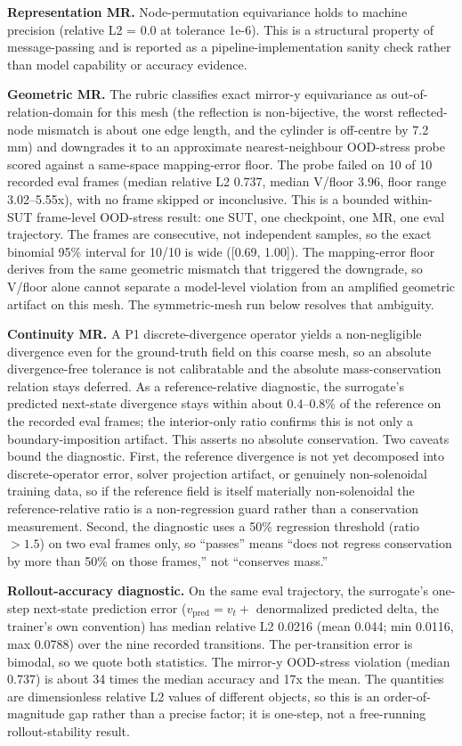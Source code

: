 \documentclass[preprint,12pt]{elsarticle}
\begin{document}
\textbf{Representation MR.} Node-permutation equivariance holds to machine precision (relative L2 = 0.0 at tolerance 1e-6). This is a structural property of message-passing and is reported as a pipeline-implementation sanity check rather than model capability or accuracy evidence.

\textbf{Geometric MR.} The rubric classifies exact mirror-y equivariance as out-of-relation-domain for this mesh (the reflection is non-bijective, the worst reflected-node mismatch is about one edge length, and the cylinder is off-centre by 7.2 mm) and downgrades it to an approximate nearest-neighbour OOD-stress probe scored against a same-space mapping-error floor. The probe failed on 10 of 10 recorded eval frames (median relative L2 0.737, median V/floor 3.96, floor range 3.02--5.55x), with no frame skipped or inconclusive. This is a bounded within-SUT frame-level OOD-stress result: one SUT, one checkpoint, one MR, one eval trajectory. The frames are consecutive, not independent samples, so the exact binomial 95\% interval for 10/10 is wide ([0.69, 1.00]). The mapping-error floor derives from the same geometric mismatch that triggered the downgrade, so V/floor alone cannot separate a model-level violation from an amplified geometric artifact on this mesh. The symmetric-mesh run below resolves that ambiguity.

\textbf{Continuity MR.} A P1 discrete-divergence operator yields a non-negligible divergence even for the ground-truth field on this coarse mesh, so an absolute divergence-free tolerance is not calibratable and the absolute mass-conservation relation stays deferred. As a reference-relative diagnostic, the surrogate's predicted next-state divergence stays within about 0.4--0.8\% of the reference on the recorded eval frames; the interior-only ratio confirms this is not only a boundary-imposition artifact. This asserts no absolute conservation. Two caveats bound the diagnostic. First, the reference divergence is not yet decomposed into discrete-operator error, solver projection artifact, or genuinely non-solenoidal training data, so if the reference field is itself materially non-solenoidal the reference-relative ratio is a non-regression guard rather than a conservation measurement. Second, the diagnostic uses a 50\% regression threshold (ratio $>1.5$) on two eval frames only, so ``passes'' means ``does not regress conservation by more than 50\% on those frames,'' not ``conserves mass.''

\textbf{Rollout-accuracy diagnostic.} On the same eval trajectory, the surrogate's one-step next-state prediction error ($v_\mathrm{pred}=v_t+$ denormalized predicted delta, the trainer's own convention) has median relative L2 0.0216 (mean 0.044; min 0.0116, max 0.0788) over the nine recorded transitions. The per-transition error is bimodal, so we quote both statistics. The mirror-y OOD-stress violation (median 0.737) is about 34 times the median accuracy and 17x the mean. The quantities are dimensionless relative L2 values of different objects, so this is an order-of-magnitude gap rather than a precise factor; it is one-step, not a free-running rollout-stability result.
\end{document}
